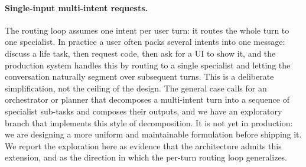 \paragraph{Single-input multi-intent requests.}
The routing loop assumes one intent per user turn: it routes the whole turn to one specialist. In practice a user often packs several intents into one message: discuss a life task, then request code, then ask for a UI to show it, and the production system handles this by routing to a single specialist and letting the conversation naturally segment over subsequent turns. This is a deliberate simplification, not the ceiling of the design. The general case calls for an orchestrator or planner that decomposes a multi-intent turn into a sequence of specialist sub-tasks and composes their outputs, and we have an exploratory branch that implements this style of decomposition. It is not yet in production: we are designing a more uniform and maintainable formulation before shipping it. We report the exploration here as evidence that the architecture admits this extension, and as the direction in which the per-turn routing loop generalizes.
